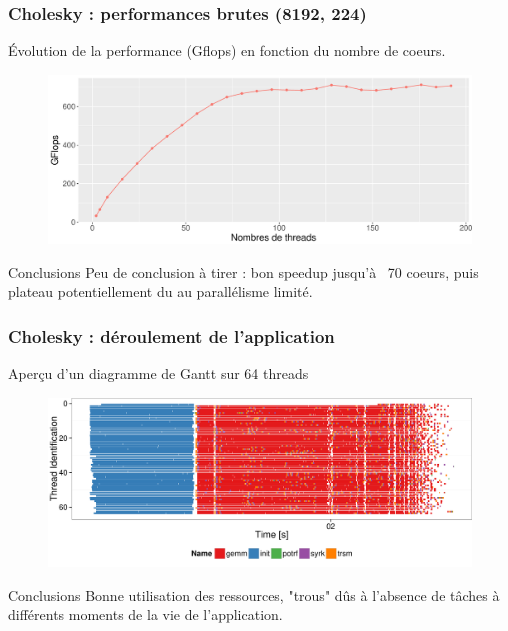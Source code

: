 \documentclass[xcolor={usenames,dvipsnames,svgnames,table}, aspectratio=43]{beamer}
\begin{document}
\begin{frame}
  \frametitle{Cholesky : performances brutes (8192, 224)}

  Évolution de la performance (Gflops) en fonction du nombre de coeurs.

\begin{figure}
  \includegraphics[width=\textwidth]{graph/graph_evolution_cholesky_8192_224.pdf}
\end{figure}
 {
  \begin{block}{Conclusions}
    Peu de conclusion à tirer : bon speedup jusqu'à ~70 coeurs, puis plateau potentiellement du au parallélisme limité.
  \end{block}
}

\end{frame}

\begin{frame}
\frametitle{Cholesky : déroulement de l'application}

Aperçu d'un diagramme de Gantt sur 64 threads
\begin{figure}
  \includegraphics[width=\textwidth]{graph/gantt_8192_224.pdf}
\end{figure}
 {
  \begin{block}{Conclusions}
    Bonne utilisation des ressources, "trous" dûs à l'absence de tâches à différents moments de la vie de l'application.
  \end{block}
}

\end{frame}
\end{document}
